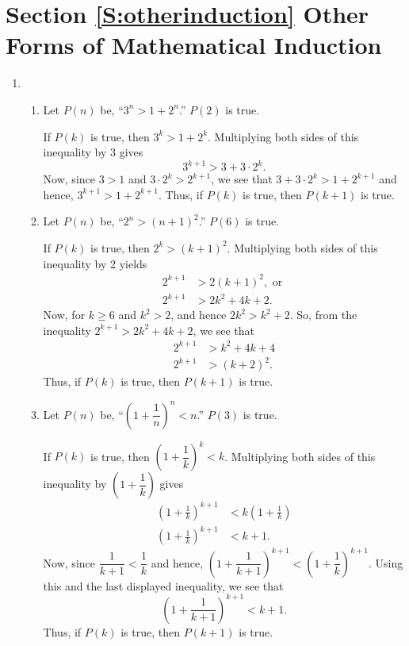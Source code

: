 \section*{Section \ref{S:otherinduction} Other Forms of Mathematical Induction}

\begin{enumerate}
\item \begin{enumerate}
\item Let $P \left( n \right)$ be, ``$3^n > 1 + 2^n$.''  $P \left( 2 \right)$ is true.

If $P \left( k \right)$ is true, then $3^k > 1 + 2^k$.  Multiplying both sides of this inequality by 3 gives
\[
3^{k + 1} > 3 + 3 \cdot 2^k.
\]
Now, since $3 > 1$ and $3 \cdot 2^k > 2^{k + 1}$, we see that $3 + 3 \cdot 2^k > 1 + 2^{k+1}$ and hence, $3^{k + 1} > 1 + 2^{k+1}$.  Thus, if $P \left( k \right)$ is true, then $P \left( k +1  \right)$ is true.

\item Let $P \left( n \right)$ be, ``$2^n  > \left( n + 1 \right)^2$.''  $P \left( 6 \right)$ is true.

If $P \left( k \right)$ is true, then $2^k  > \left( k + 1 \right)^2$.  Multiplying both sides of this inequality by 2 yields
\[
\begin{aligned}
2^{k + 1} &> 2 \left( k + 1 \right)^2, \text{ or } \\
2^{k + 1} &> 2k^2 + 4k + 2.
\end{aligned}
\]
Now, for $k \geq 6$ and $k^2 > 2$, and hence $2k^2 > k^2 + 2$.  So, from the inequality 
$2^{k + 1} > 2k^2 + 4k + 2$, we see that
\[
\begin{aligned}
2^{k + 1} &> k^2 + 4k + 4 \\
2^{k + 1} &> \left( k + 2 \right)^2.
\end{aligned}
\]
Thus, if $P \left( k \right)$ is true, then $P \left( k +1  \right)$ is true.

\item Let $P \left( n \right)$ be, ``$\left( {1 + \dfrac{1}{n}} \right)^n  < n$.''  
$P \left( 3 \right)$ is true.

If $P \left( k \right)$ is true, then $\left( {1 + \dfrac{1}{k}} \right)^k  < k$.  Multiplying both sides of this inequality by $\left( 1 + \dfrac{1}{k} \right)$ gives
\[
\begin{aligned}
\left( {1 + \frac{1}{k}} \right)^{k+1}  &< k \left( 1 + \frac{1}{k} \right) \\
\left( {1 + \frac{1}{k}} \right)^{k+1}  &< k + 1.
\end{aligned}
\]
Now, since $\dfrac{1}{k+1} < \dfrac{1}{k}$ and hence, 
$\left( {1 + \dfrac{1}{k + 1}} \right)^{k+1} < \left( {1 + \dfrac{1}{k}} \right)^{k+1}$.  Using this and the last displayed inequality, we see that 
\[
\left( {1 + \dfrac{1}{k + 1}} \right)^{k+1} < k + 1.
\]
Thus, if $P \left( k \right)$ is true, then $P \left( k +1  \right)$ is true.
\end{enumerate}



\end{enumerate}
